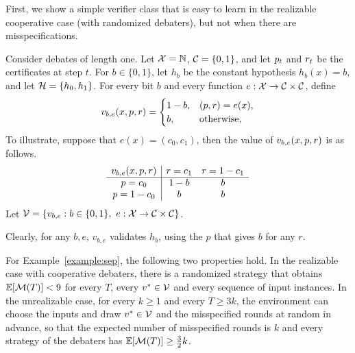 First, we show a simple verifier class that is easy to learn in the realizable cooperative case (with randomized debaters), but not when there are misspecifications.

\begin{example}\label{example:sep}
    Consider debates of length one. Let ${\mathcal X}=\mathbb{N}$, ${{\mathcal C}}=\{0,1\}$, and let ${p}_t$ and ${r}_t$ be the certificates at step $t$. For $b\in\{0,1\}$, let $h_b$ be the constant hypothesis $h_b(x)=b$, and let ${{\mathcal H}}=\{h_0,h_1\}$. For every bit $b$ and every function $e:{\mathcal X}\to {{\mathcal C}}\times{{\mathcal C}}$, define
\[
v_{b,e}(x,{p},{r})=
\begin{cases}
1-b, & ({p},{r})=e(x),\\
b, & \text{otherwise},
\end{cases}
\]
To illustrate, suppose that $e(x) = (c_0,c_1)$, then the value of $v_{b,e}(x,{p},{r})$ is as follows.
\[
\begin{array}{c|cc}
v_{b,e}(x,{p},{r}) & {r}=c_1 & {r}=1-c_1\\
\hline
{p}=c_0 & 1-b & b\\
{p}=1-c_0 & b & b
\end{array}
\]
Let ${\mathcal V}=\{v_{b,e}:b\in\{0,1\},\ e:{\mathcal X}\to {{\mathcal C}}\times{{\mathcal C}} \}$. 

Clearly, for any $b,e$, $v_{b,e}$ validates $h_b$, using the $p$ that gives $b$ for any $r$. 
\end{example}


\begin{theorem}\label{thm:examplesep}
For Example~\ref{example:sep}, the following two properties hold. In the realizable case with cooperative debaters, there is a randomized strategy that obtains $\mathbb{E}[{\mathcal M}(T)]<9$ for every $T$, every $v^*\in{\mathcal V}$ and every sequence of input instances. In the unrealizable case, for every $k\ge1$ and every $T\ge 3k$, the environment 
can choose the inputs and draw $v^*\in{\mathcal V}$ and the misspecified rounds at random in advance, so that the expected number of misspecified rounds is $k$ and every strategy of the debaters has $\mathbb{E}[{\mathcal M}(T)]\ge\frac32k$.
\end{theorem}



